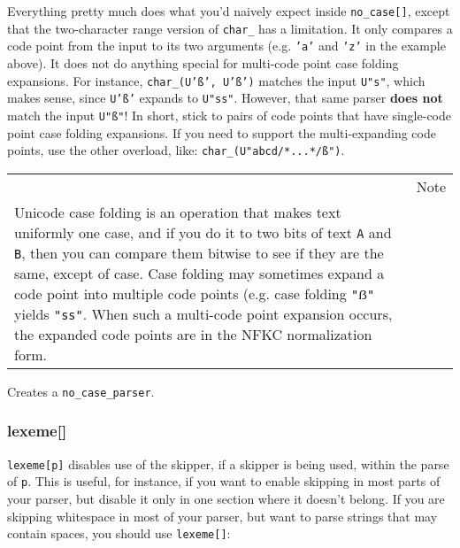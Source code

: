 Everything pretty much does what you'd naively expect inside \texttt{no\_case{[}{]}}, except that the two-character range version of \texttt{char\_} has a limitation. It only compares a code point from the input to its two arguments (e.g. \texttt{'a'} and \texttt{'z'} in the example above). It does not do anything special for multi-code point case folding expansions. For instance, \texttt{char\_(U'ß', U'ß')} matches the input \texttt{U"s"}, which makes sense, since \texttt{U'ß'} expands to \texttt{U"ss"}. However, that same parser \textbf{does not} match the input \texttt{U"ß"}! In short, stick to pairs of code points that have single-code point case folding expansions. If you need to support the multi-expanding code points, use the other overload, like: \texttt{char\_(U"abcd/*...*/ß")}.

\begin{longtable}[]{@{}
  >{\raggedright\arraybackslash}p{}
  >{\raggedright\arraybackslash}p{}@{}}
\toprule\noalign{}
\endhead
\bottomrule\noalign{}
\endlastfoot
\begin{minipage}[t]{\linewidth}\raggedright
\end{minipage} & Note \\
Unicode case folding is an operation that makes text uniformly one case, and if you do it to two bits of text \texttt{A} and \texttt{B}, then you can compare them bitwise to see if they are the same, except of case. Case folding may sometimes expand a code point into multiple code points (e.g. case folding \texttt{"ẞ"} yields \texttt{"ss"}. When such a multi-code point expansion occurs, the expanded code points are in the NFKC normalization form. & \\
\end{longtable}

Creates a \texttt{no\_case\_parser}.

\subsubsection{lexeme{[}{]}}

\texttt{lexeme{[}p{]}} disables use of the skipper, if a skipper is being used, within the parse of \texttt{p}. This is useful, for instance, if you want to enable skipping in most parts of your parser, but disable it only in one section where it doesn't belong. If you are skipping whitespace in most of your parser, but want to parse strings that may contain spaces, you should use \texttt{lexeme{[}{]}}:


